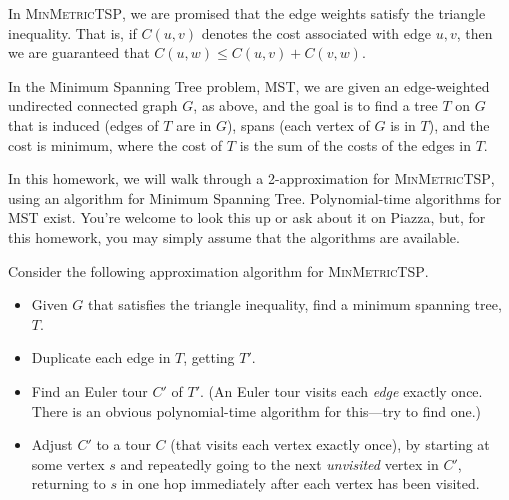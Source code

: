 \documentclass[2pt]{scrartcl}
\begin{document}
\begin{multicols}{6}
{In \textsc{MinMetricTSP}, we are promised that the edge weights
satisfy the triangle inequality.  That is, if $C(u,v)$ denotes the
cost associated with edge $u,v$, then we are guaranteed that
$C(u,w)\le C(u,v)+C(v,w)$.

In the Minimum Spanning Tree problem, \textsc{MST}, we are given an
edge-weighted undirected connected graph $G$, as above, and the goal
is to find a tree $T$ on $G$ that is induced (edges of $T$ are in
$G$), spans (each vertex of $G$ is in $T$), and the cost is minimum,
where the cost of $T$ is the sum of the costs of the edges in $T$.

In this homework, we will walk through a 2-approximation for
\textsc{MinMetricTSP}, using an algorithm for Minimum Spanning Tree.
Polynomial-time algorithms for \textsc{MST} exist.  You're welcome to
look this up or ask about it on Piazza, but, for this homework, you
may simply assume that the algorithms are available.

Consider the following approximation algorithm for \textsc{MinMetricTSP}.

\begin{itemize}
\item Given $G$ that satisfies the triangle inequality, find a minimum
  spanning tree, $T$.
\item Duplicate each edge in $T$, getting $T'$.
\item Find an Euler tour $C'$ of $T'$.  (An Euler tour visits each
  {\em edge} exactly once.  There is an obvious polynomial-time
  algorithm for this---try to find one.)
\item Adjust $C'$ to a tour $C$ (that visits each vertex exactly
  once), by starting at some vertex $s$ and repeatedly going to the next
  {\em unvisited} vertex in $C'$, returning to $s$ in one hop
  immediately after each vertex has been visited.
\end{itemize}

}
\end{multicols}
\end{document}
